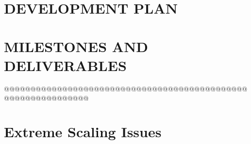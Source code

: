 \documentclass[14pt]{article}
\begin{document}
%   
\section{DEVELOPMENT PLAN} \label{s:plan}

% 
\section{MILESTONES AND DELIVERABLES} \label{s:milestones}
%
%   

@@@@@@@@@@@@@@@@@@@@@@@@@@@@@@@@@@@@@@@@@@@@@@@@@@@@@@@@@@@@@@






\section{Extreme Scaling Issues} \label{s:scaling}
\end{document}
